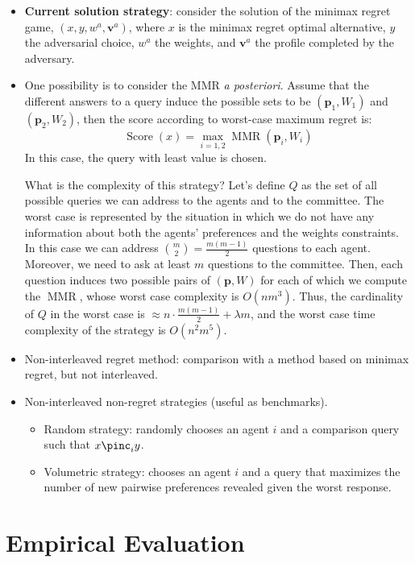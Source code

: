 \documentclass[12pt]{article}
\newcommand{\profile}{\textbf{v}}%
\newcommand{\pprofile}{\textbf{p}}%
\DeclareMathOperator{\SCORE}{Score}
\DeclareMathOperator{\MMR}{MMR}
\begin{document}
\begin{itemize}
\item \textbf{Current solution strategy}: consider the solution of the minimax regret game, 
 $(x,y,w^{a},\profile^{a})$, where $x$ is the minimax regret optimal alternative, $y$ the adversarial choice, $w^{a}$ the weights, and $\profile^{a}$ the profile completed by the adversary.
 
 \item One possibility is to consider the MMR {\em a posteriori}. Assume that the different answers to a query induce the possible sets to be $(\pprofile_1,W_1)$ and $(\pprofile_2,W_2)$, then the score according to worst-case maximum regret is:
\[\SCORE(x)= \max_{i=1,2} \MMR(\pprofile_i,W_i) \]
In this case, the query with least value is chosen.

What is the complexity of this strategy? Let's define $Q$ as the set of all possible queries we can address to the agents and to the committee. The worst case is represented by the situation in which we do not have any information about both the agents' preferences and the weights constraints. In this case we can address $\binom{m}{2}=\frac{m(m-1)}{2}$ questions to each agent. Moreover, we need to ask at least $m$ questions to the committee. Then, each question induces two possible pairs of $(\pprofile,W)$ for each of which we compute the $\MMR$, whose worst case complexity is $O(nm^3)$. Thus, the cardinality of $Q$ in the worst case is $\approx n \cdot \frac{m(m-1)}{2} + \lambda m$, and the worst case time complexity of the strategy is $O(n^2m^5)$.

\item Non-interleaved regret method: comparison with a method based on minimax regret, but not interleaved. 

\item Non-interleaved non-regret strategies (useful as benchmarks).	
	\begin{itemize}
		\item Random strategy: randomly chooses an agent $i$ and a comparison query such that $x \pinc_i y$.
		\item Volumetric strategy: chooses an agent $i$ and a query that maximizes the number of new pairwise preferences revealed given the worst response.
	\end{itemize}
\end{itemize}

\section{Empirical Evaluation}
\end{document}
